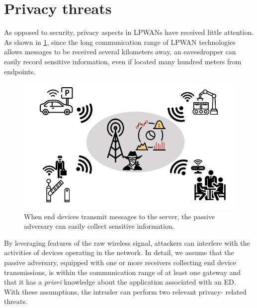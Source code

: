 \section{Privacy threats}
As opposed to security, privacy aspects in LPWANs have received little attention. As shown in \ref{fig:passive}, since the long communication range of LPWAN technologies allows messages to be received several kilometers away, an eavesdropper can easily record sensitive information, even if located many hundred meters from endpoints.
\begin{figure}[ht]
    \centering
    \includegraphics[width=0.7\linewidth]{images/threat/passive_adversary.png}
    \caption{When end devices transmit messages to the server, the passive adversary can easily collect sensitive information.}
    \label{fig:passive}
\end{figure}
By leveraging features of the raw wireless signal, attackers can interfere with the activities of devices operating in the network. In detail, we assume that the passive adversary, equipped with one or more receivers collecting end device transmissions, is within the communication range of at least one gateway and that it has a \textit{priori} knowledge about the application associated with an ED.  
\\
With these assumptions, the intruder can perform two relevant privacy-
related threats.

